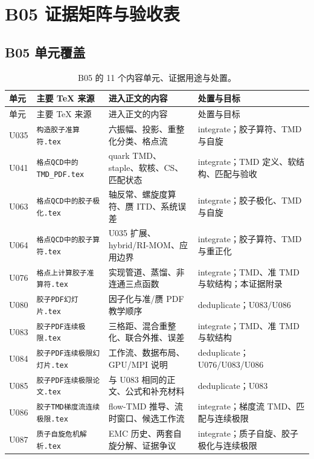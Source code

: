 \chapter{B05 证据矩阵与验收表}\label{sec:b05-appendix}
\section{B05 单元覆盖}

\begin{longtable}{@{}>{\raggedright\arraybackslash}p{}>{\raggedright\arraybackslash}p{}>{\raggedright\arraybackslash}p{}>{\raggedright\arraybackslash}p{}@{}}
  \caption{B05 的 11 个内容单元、证据用途与处置。}\label{tab:b05-coverage}\\
  \toprule
  单元 & 主要 TeX 来源 & 进入正文的内容 & 处置与目标 \\
  \midrule
  \endfirsthead
  \toprule
  单元 & 主要 TeX 来源 & 进入正文的内容 & 处置与目标 \\
  \midrule
  \endhead
  \bottomrule
  \endfoot
  U035 & \texttt{构造胶子准算符.tex} & 六振幅、投影、重整化分类、格点流 & integrate；胶子算符、TMD 与自旋 \\
  U041 & \texttt{格点QCD中的TMD\_PDF.tex} & quark TMD、staple、软核、CS、匹配状态 & integrate；TMD 定义、软结构、匹配与验收 \\
  U063 & \texttt{格点QCD中的胶子极化.tex} & 轴反常、螺旋度算符、赝 ITD、系统误差 & integrate；胶子极化、TMD 与自旋 \\
  U064 & \texttt{格点QCD中的胶子算符.tex} & U035 扩展、hybrid/RI-MOM、应用边界 & integrate；胶子算符、TMD 与重正化 \\
  U076 & \texttt{格点上计算胶子准算符.tex} & 实现管道、蒸馏、非连通三点函数 & integrate；TMD、准 TMD 与软结构；本证据附录 \\
  U080 & \texttt{胶子PDF幻灯片.tex} & 因子化与准/赝 PDF 教学顺序 & deduplicate；U083/U086 \\
  U083 & \texttt{胶子PDF连续极限.tex} & 三格距、混合重整化、联合外推、误差 & integrate；TMD、准 TMD 与软结构 \\
  U084 & \texttt{胶子PDF连续极限幻灯片.tex} & 工作流、数据布局、GPU/MPI 说明 & deduplicate；U076/\allowbreak U083/\allowbreak U086 \\
  U085 & \texttt{胶子PDF连续极限论文.tex} & 与 U083 相同的正文、公式和补充材料 & deduplicate；U083 \\
  U086 & \texttt{胶子TMD梯度流连续极限.tex} & flow-TMD 推导、流时窗口、候选工作流 & integrate；梯度流 TMD、匹配与连续极限 \\
  U087 & \texttt{质子自旋危机解析.tex} & EMC 历史、两套自旋分解、证据争议 & integrate；质子自旋、胶子极化与连续极限 \\
\end{longtable}

